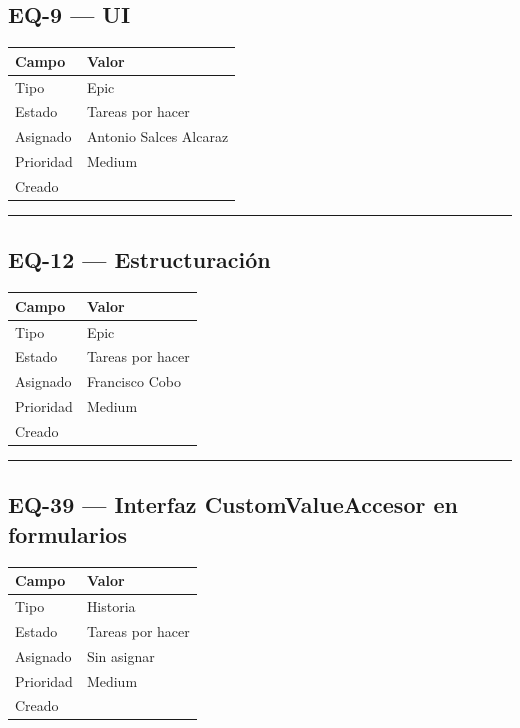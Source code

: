 \documentclass[
  spanish,
  11pt,
]{report}
\newcounter{none} %
\begin{document}
\subsection{EQ-9 --- UI}\label{eq-9-ui}

{\def\LTcaptype{none} %
\begin{longtable}[]{@{}ll@{}}
\toprule\noalign{}
Campo & Valor \\
\midrule\noalign{}
\endhead
\bottomrule\noalign{}
\endlastfoot
Tipo & Epic \\
Estado & Tareas por hacer \\
Asignado & Antonio Salces Alcaraz \\
Prioridad & Medium \\
Creado & \\
\end{longtable}
}

\begin{center}\rule{0.5\linewidth}{0.5pt}\end{center}

\subsection{EQ-12 --- Estructuración}\label{eq-12-estructuraciuxf3n}

{\def\LTcaptype{none} %
\begin{longtable}[]{@{}ll@{}}
\toprule\noalign{}
Campo & Valor \\
\midrule\noalign{}
\endhead
\bottomrule\noalign{}
\endlastfoot
Tipo & Epic \\
Estado & Tareas por hacer \\
Asignado & Francisco Cobo \\
Prioridad & Medium \\
Creado & \\
\end{longtable}
}

\begin{center}\rule{0.5\linewidth}{0.5pt}\end{center}

\subsection{EQ-39 --- Interfaz CustomValueAccesor en
formularios}\label{eq-39-interfaz-customvalueaccesor-en-formularios}

{\def\LTcaptype{none} %
\begin{longtable}[]{@{}ll@{}}
\toprule\noalign{}
Campo & Valor \\
\midrule\noalign{}
\endhead
\bottomrule\noalign{}
\endlastfoot
Tipo & Historia \\
Estado & Tareas por hacer \\
Asignado & Sin asignar \\
Prioridad & Medium \\
Creado & \\
\end{longtable}
}
\end{document}
